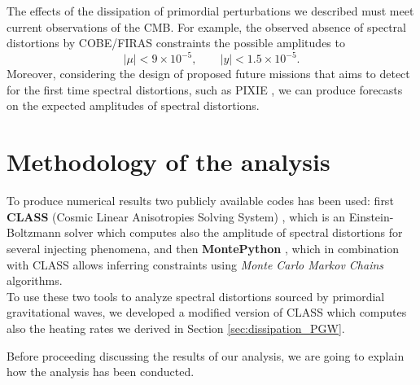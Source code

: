 \label{chap:constr}
The effects of the dissipation of primordial perturbations we described must meet current observations of the CMB. For example, the observed absence of spectral distortions by COBE/FIRAS \cite{COBE1996} constraints the possible amplitudes to 
\begin{equation}
    |\mu|<9\times10^{-5}, \qquad  |y|<1.5\times 10^{-5}.
\end{equation}
Moreover, considering the design of proposed future missions that aims to detect for the first time spectral distortions, such as PIXIE \cite{pixie}, we can produce forecasts on the expected amplitudes of spectral distortions.
\section{Methodology of the analysis}
To produce numerical results two publicly available codes has been used: first \textbf{CLASS} (Cosmic Linear Anisotropies Solving System) \cite{CLASS}, which is an Einstein-Boltzmann solver which computes also the amplitude of spectral distortions for several injecting phenomena, and then \textbf{MontePython} \cite{Brinckmann:2018cvx,Audren:2012wb}, which in combination with CLASS allows inferring constraints using \emph{Monte Carlo Markov Chains} algorithms.\\
To use these two tools to analyze spectral distortions sourced by primordial gravitational waves, we developed a modified version of CLASS which computes also the heating rates we derived in Section \ref{sec:dissipation_PGW}. 

Before proceeding discussing the results of our analysis, we are going to explain how the analysis has been conducted.

